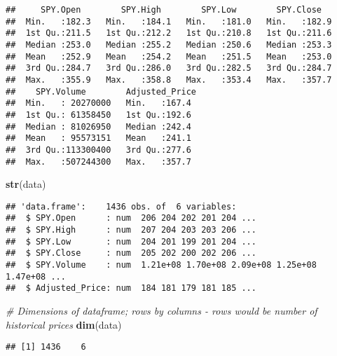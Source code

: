 \documentclass[
]{article}
\newenvironment{Shaded}{\begin{snugshade}}{\end{snugshade}}
\newcommand{\CommentTok}[1]{\textcolor[rgb]{0.56,0.35,0.01}{\textit{#1}}}
\newcommand{\KeywordTok}[1]{\textcolor[rgb]{0.13,0.29,0.53}{\textbf{#1}}}
\newcommand{\NormalTok}[1]{#1}
\begin{document}
\begin{verbatim}
##     SPY.Open        SPY.High        SPY.Low        SPY.Close    
##  Min.   :182.3   Min.   :184.1   Min.   :181.0   Min.   :182.9  
##  1st Qu.:211.5   1st Qu.:212.2   1st Qu.:210.8   1st Qu.:211.6  
##  Median :253.0   Median :255.2   Median :250.6   Median :253.3  
##  Mean   :252.9   Mean   :254.2   Mean   :251.5   Mean   :253.0  
##  3rd Qu.:284.7   3rd Qu.:286.0   3rd Qu.:282.5   3rd Qu.:284.7  
##  Max.   :355.9   Max.   :358.8   Max.   :353.4   Max.   :357.7  
##    SPY.Volume        Adjusted_Price 
##  Min.   : 20270000   Min.   :167.4  
##  1st Qu.: 61358450   1st Qu.:192.6  
##  Median : 81026950   Median :242.4  
##  Mean   : 95573151   Mean   :241.1  
##  3rd Qu.:113300400   3rd Qu.:277.6  
##  Max.   :507244300   Max.   :357.7
\end{verbatim}

\begin{Shaded}
\begin{Highlighting}[]
    \KeywordTok{str}\NormalTok{(data)}
\end{Highlighting}
\end{Shaded}

\begin{verbatim}
## 'data.frame':    1436 obs. of  6 variables:
##  $ SPY.Open      : num  206 204 202 201 204 ...
##  $ SPY.High      : num  207 204 203 203 206 ...
##  $ SPY.Low       : num  204 201 199 201 204 ...
##  $ SPY.Close     : num  205 202 200 202 206 ...
##  $ SPY.Volume    : num  1.21e+08 1.70e+08 2.09e+08 1.25e+08 1.47e+08 ...
##  $ Adjusted_Price: num  184 181 179 181 185 ...
\end{verbatim}

\begin{Shaded}
\begin{Highlighting}[]
  \CommentTok{# Dimensions of dataframe; rows by columns - rows would be number of historical prices  }
    \KeywordTok{dim}\NormalTok{(data)}
\end{Highlighting}
\end{Shaded}

\begin{verbatim}
## [1] 1436    6
\end{verbatim}
\end{document}
